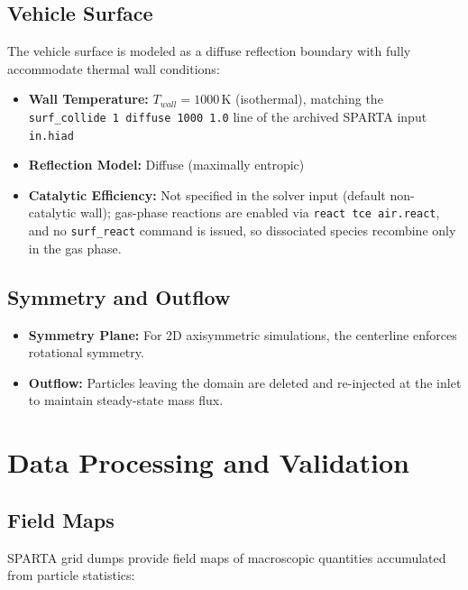 \subsection{Vehicle Surface}
The vehicle surface is modeled as a diffuse reflection boundary with fully accommodate thermal wall conditions:
\begin{itemize}
    \item \textbf{Wall Temperature:} $T_{wall} = 1000$\,K (isothermal), matching the \texttt{surf\_collide 1 diffuse 1000 1.0} line of the archived SPARTA input \texttt{in.hiad}
    \item \textbf{Reflection Model:} Diffuse (maximally entropic)
    \item \textbf{Catalytic Efficiency:} Not specified in the solver input (default non-catalytic wall); gas-phase reactions are enabled via \texttt{react tce air.react}, and no \texttt{surf\_react} command is issued, so dissociated species recombine only in the gas phase.
\end{itemize}

\subsection{Symmetry and Outflow}
\begin{itemize}
    \item \textbf{Symmetry Plane:} For 2D axisymmetric simulations, the centerline enforces rotational symmetry.
    \item \textbf{Outflow:} Particles leaving the domain are deleted and re-injected at the inlet to maintain steady-state mass flux.
\end{itemize}

\section{Data Processing and Validation}

\subsection{Field Maps}
SPARTA grid dumps provide field maps of macroscopic quantities accumulated from particle statistics:

